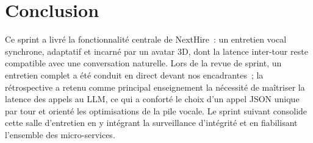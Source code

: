 \section{Conclusion}

Ce sprint a livré la fonctionnalité centrale de NextHire~: un entretien vocal synchrone, adaptatif et incarné par un avatar 3D, dont la latence inter-tour reste compatible avec une conversation naturelle. Lors de la revue de sprint, un entretien complet a été conduit en direct devant nos encadrantes~; la rétrospective a retenu comme principal enseignement la nécessité de maîtriser la latence des appels au LLM, ce qui a conforté le choix d'un appel JSON unique par tour et orienté les optimisations de la pile vocale. Le sprint suivant consolide cette salle d'entretien en y intégrant la surveillance d'intégrité et en fiabilisant l'ensemble des micro-services.
